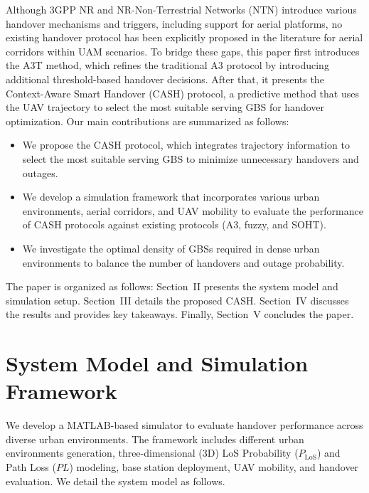 \documentclass[10pt,conference]{IEEEtran}
\begin{document}
Although 3GPP NR and NR-Non-Terrestrial Networks (NTN) introduce various handover mechanisms and triggers, including support for aerial platforms, no existing handover protocol has been explicitly proposed in the literature for aerial corridors within UAM scenarios. To bridge these gaps, this paper first introduces the A3T method, which refines the traditional A3 protocol by introducing additional threshold-based handover decisions. After that, it presents the Context-Aware Smart Handover (CASH) protocol, a predictive method that uses the UAV trajectory to select the most suitable serving GBS for handover optimization. Our main contributions are summarized as follows:




\begin{itemize}
    \item We propose the CASH protocol, which integrates trajectory information to select the most suitable serving GBS to minimize unnecessary handovers and outages.
    \item We develop a simulation framework that incorporates various urban environments, aerial corridors, and UAV mobility to evaluate the performance of CASH protocols against existing protocols (A3, fuzzy, and SOHT).
    \item We investigate the optimal density of GBSs required in dense urban environments to balance the number of handovers and outage probability.   
\end{itemize}

The paper is organized as follows: Section~II presents the system model and simulation setup. Section~III details the proposed CASH. Section~IV discusses the results and provides key takeaways. Finally, Section~V concludes the paper.


\section{System Model and Simulation Framework}
We develop a MATLAB-based simulator to evaluate handover performance across diverse urban environments. The framework includes different urban environments generation, three-dimensional (3D) LoS Probability ($P_{\mathrm{LoS}}$) and  Path Loss ($PL$) modeling, base station deployment, UAV mobility, and handover evaluation. We detail the system model as follows. 
\end{document}
